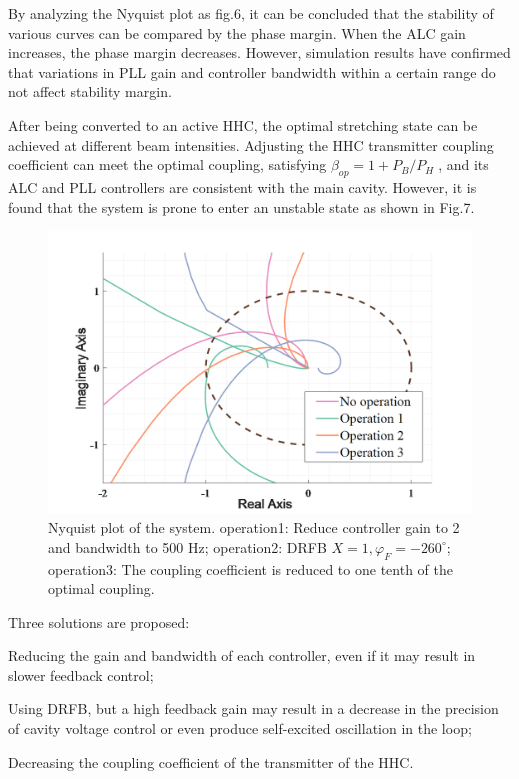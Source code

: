 \documentclass[letterpaper,
               nospread,     %
               ]{jacow}
\begin{document}
By analyzing the Nyquist plot as fig.6, it can be concluded that the stability of
various curves can be compared by the phase margin. When the ALC gain increases,
the phase margin decreases. However, simulation results have confirmed that variations
in PLL gain and controller bandwidth within a certain range do not affect stability margin.

After being converted to an active HHC, the optimal stretching state can be achieved
at different beam intensities. Adjusting the HHC transmitter coupling coefficient
can meet the optimal coupling, satisfying ${{\beta }_{op}}=1+{{{P}_{B}}}/{{{P}_{H}}}\;$\cite{ref15},
and its ALC and PLL controllers are consistent with the main cavity. However, it is found that the system is prone to enter an unstable state as shown in Fig.7.
\begin{figure}[!htb]
   \centering
   \includegraphics*[width=0.7\columnwidth]{THPA037_f7}
   \caption{Nyquist plot of the system. operation1: Reduce controller gain to 2 and bandwidth to 500 Hz; operation2: DRFB
      $X=1,{\varphi _F}=-260^\circ $; operation3: The coupling coefficient is reduced to one tenth of the optimal coupling.}
   \label{fig:paper_layout}
\end{figure}

Three solutions are proposed:
\begin{Itemize}
   \item  Reducing the gain and bandwidth of each controller, even if it may result in slower feedback control;
   \item  Using DRFB, but a high feedback gain may result in a decrease in the precision of cavity voltage control or even produce self-excited oscillation in the loop;
   \item  Decreasing the coupling coefficient of the transmitter of the HHC.
\end{Itemize}
\end{document}

